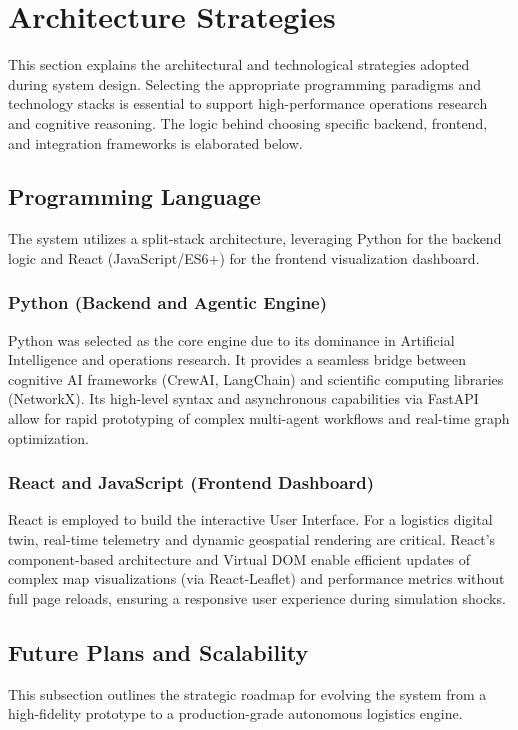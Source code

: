 \section[Architecture Strategies]{Architecture Strategies}
This section explains the architectural and technological strategies adopted during system design. Selecting the appropriate programming paradigms and technology stacks is essential to support high-performance operations research and cognitive reasoning. The logic behind choosing specific backend, frontend, and integration frameworks is elaborated below.

\subsection[Programming Language]{Programming Language}
The system utilizes a split-stack architecture, leveraging Python for the backend logic and React (JavaScript/ES6+) for the frontend visualization dashboard.

\subsubsection{Python (Backend and Agentic Engine)}
Python was selected as the core engine due to its dominance in Artificial Intelligence and operations research. It provides a seamless bridge between cognitive AI frameworks (CrewAI, LangChain) and scientific computing libraries (NetworkX). Its high-level syntax and asynchronous capabilities via FastAPI allow for rapid prototyping of complex multi-agent workflows and real-time graph optimization.

\subsubsection{React and JavaScript (Frontend Dashboard)}
React is employed to build the interactive User Interface. For a logistics digital twin, real-time telemetry and dynamic geospatial rendering are critical. React’s component-based architecture and Virtual DOM enable efficient updates of complex map visualizations (via React-Leaflet) and performance metrics without full page reloads, ensuring a responsive user experience during simulation shocks.

\subsection[Future Plans and Scalability]{Future Plans and Scalability}
This subsection outlines the strategic roadmap for evolving the system from a high-fidelity prototype to a production-grade autonomous logistics engine.

